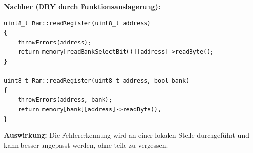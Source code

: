\textbf{Nachher (DRY durch Funktionsauslagerung):}

\begin{lstlisting}[style=codeblock,language=picassocpp]
uint8_t Ram::readRegister(uint8_t address)
{
    throwErrors(address);
    return memory[readBankSelectBit()][address]->readByte();
}

uint8_t Ram::readRegister(uint8_t address, bool bank)
{
    throwErrors(address, bank);
    return memory[bank][address]->readByte();
}
\end{lstlisting}

\textbf{Auswirkung:} Die Fehlererkennung wird an einer lokalen Stelle durchgeführt und kann besser angepasst werden, ohne teile zu vergessen.

